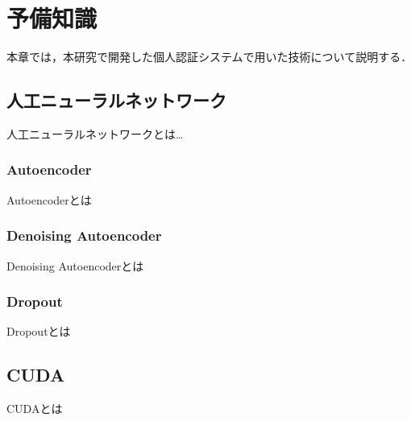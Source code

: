 \chapter{予備知識}
本章では，本研究で開発した個人認証システムで用いた技術について説明する．

\section{人工ニューラルネットワーク}
人工ニューラルネットワークとは…

\subsection{Autoencoder}
Autoencoderとは

\subsection{Denoising Autoencoder}
Denoising Autoencoderとは

\subsection{Dropout}
Dropoutとは

\section{CUDA}
CUDAとは
